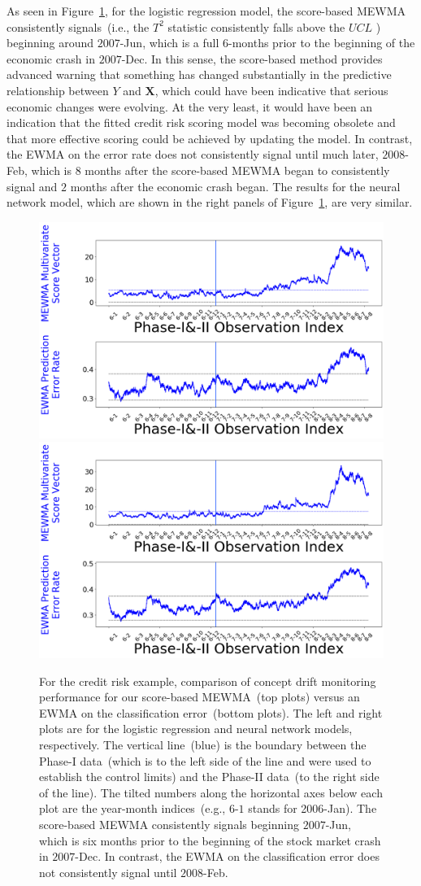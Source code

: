 \documentclass[twoside,11pt]{article}
\begin{document}
As seen in Figure~\ref{fig:credit_default}, for the logistic regression model, the score-based MEWMA consistently signals~(i.e., the $T^2$ statistic consistently falls above the $UCL$ ) beginning around $2007$-Jun, which is a full $6$-months prior to the beginning of the economic crash in $2007$-Dec. In this sense, the score-based method provides advanced warning that something has changed substantially in the predictive relationship between $Y$ and $\bm{X}$, which could have been indicative that serious economic changes were evolving. At the very least, it would have been an indication that the fitted credit risk scoring model was becoming obsolete and that more effective scoring could be achieved by updating the model. In contrast, the EWMA on the error rate does not consistently signal until much later, $2008$-Feb, which is $8$ months after the score-based MEWMA began to consistently signal and $2$ months after the economic crash began. The results for the neural network model, which  are shown in the right panels of Figure~\ref{fig:credit_default}, are very similar. 

\begin{figure}[!htbp]
\centering
\includegraphics[width = 0.49\linewidth]{../figures/v14/credit_default/logi_scal_train_PI/credit_logi_1e-08_0_0001_0_001_99_0.png}
\includegraphics[width = 0.49\linewidth]{../figures/v14/credit_default/logi_nnet_scal_train_PI/credit_logi_0_002_0_0001_0_001_99_0.png}
  \caption{
For the credit risk example, comparison of concept drift monitoring performance for our score-based MEWMA~(top plots) versus an EWMA on the classification error~(bottom plots). The left and right plots are for the logistic regression and neural network models, respectively. The vertical line~(blue) is the boundary between the Phase-I data~(which is to the left side of the line and were used to establish the control limits) and the Phase-II data~(to the right side of the line). The tilted numbers along the horizontal axes below each plot are the year-month indices~(e.g., $6$-$1$ stands for 2006-Jan). The score-based MEWMA consistently signals beginning $2007$-Jun, which is six months prior to the beginning of the stock market crash in $2007$-Dec. In contrast, the EWMA on the classification error does not consistently signal until $2008$-Feb. 
}
\label{fig:credit_default}
\end{figure}
\end{document}
